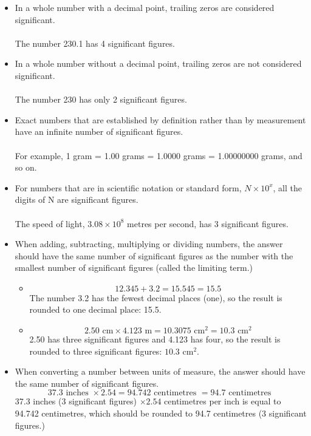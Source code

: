 \documentclass{article}
\begin{document}
\begin{enumerate}
\begin{itemize}
\item In a whole number with a decimal point, trailing zeros are considered significant.\\\\The number 230.1 has 4 significant figures.

\item In a whole number without a decimal point, trailing zeros are not considered significant.\\\\The number 230 has only 2 significant figures.

\item Exact numbers that are established by definition rather than by measurement have an infinite number of significant figures.\\\\For example, 1 gram = 1.00 grams = 1.0000 grams = 1.00000000 grams, and so on.

\item For numbers that are in scientific notation or standard form, $N\times10^x$, all the digits of N are significant figures.\\\\The speed of light, $3.08 \times10^8$ metres per second, has 3 significant figures.

\item When adding, subtracting, multiplying or dividing numbers, the answer should have the same number of significant figures as the number with the smallest number of significant figures (called the limiting term.)
\begin{itemize}
\item [] $$12.345 + 3.2 = 15.545 = 15.5$$ The number 3.2 has the fewest decimal places (one), so the result is rounded to one decimal place: 15.5.
\item []$$2.50\textrm{ cm} \times 4.123\textrm{ m} = 10.3075\textrm{ cm}^2 = 10.3\textrm{ cm}^2$$ 2.50 has three significant figures and 4.123 has four, so the result is rounded to three significant figures: $10.3\textrm{ cm}^2$.
\end{itemize}

\item When converting a number between units of measure, the answer should have the same number of significant figures.$$37.3 \textrm{ inches } \times 2.54 = 94.742 \textrm{ centimetres } = 94.7 \textrm{ centimetres }$$37.3 inches (3 significant figures) $\times 2.54$ centimetres per inch is equal to 94.742 centimetres, which should be rounded to 94.7 centimetres (3 significant figures.)


\end{itemize}
\end{enumerate}
\end{document}
